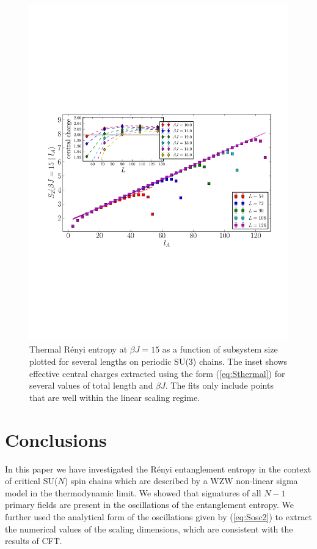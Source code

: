 \documentclass[aps,prb,reprint,floatfix]{revtex4-1}
\begin{document}
\begin{figure}
\centerline{\includegraphics[angle=0,width=1.0\columnwidth]{su3_thermal_renyi2.pdf}}
\caption{Thermal R\'{e}nyi entropy at $\beta J = 15$ as a function of subsystem size plotted for several lengths on  periodic SU(3) chains.  The inset shows effective central charges extracted using the form (\ref{eq:Sthermal}) for several values of total length and $\beta J$.  The fits only include points that are well within the linear scaling regime.}
\label{fig:finiteTsu3}
\end{figure}
\section{Conclusions} 
\label{sec:conclusions}
In this paper we have investigated the R\'{e}nyi entanglement entropy in the context of critical SU($N$) spin chains which are described by a WZW non-linear sigma model in the thermodynamic limit.  We showed that signatures of all $N-1$ primary fields are present in the oscillations of the entanglement entropy.  We further used the analytical form of the oscillations given by (\ref{eq:Sosc2}) to extract the numerical values of the scaling dimensions, which are consistent with the results of CFT.  
\end{document}
